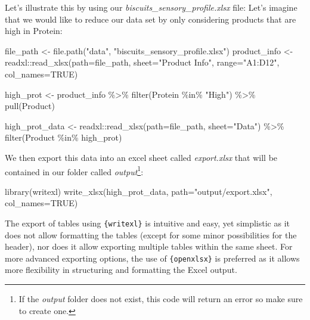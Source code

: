 \documentclass[
]{krantz}
\makeatletter
\newenvironment{Shaded}{\begin{snugshade}}{\end{snugshade}}
\newcommand{\AttributeTok}[1]{\textcolor[rgb]{0.61,0.61,0.61}{#1}}
\newcommand{\ConstantTok}[1]{\textcolor[rgb]{0,0,0}{#1}}
\newcommand{\FunctionTok}[1]{\textcolor[rgb]{0,0,0}{#1}}
\newcommand{\NormalTok}[1]{#1}
\newcommand{\OtherTok}[1]{\textcolor[rgb]{0.37,0.37,0.37}{#1}}
\newcommand{\SpecialCharTok}[1]{\textcolor[rgb]{0,0,0}{#1}}
\newcommand{\StringTok}[1]{\textcolor[rgb]{0.5,0.5,0.5}{#1}}
\newenvironment{kframe}{%
\medskip{}
\setlength{\fboxsep}{.8em}
 \def\at@end@of@kframe{}%
 \ifinner\ifhmode%
  \def\at@end@of@kframe{\end{minipage}}%
  \begin{minipage}{\columnwidth}%
 \fi\fi%
 \def\FrameCommand##1{\hskip\@totalleftmargin \hskip-\fboxsep
 \colorbox{shadecolor}{##1}\hskip-\fboxsep
     \hskip-\linewidth \hskip-\@totalleftmargin \hskip\columnwidth}%
 \MakeFramed {\advance\hsize-\width
   \@totalleftmargin\z@ \linewidth\hsize
   \@setminipage}}%
 {\par\unskip\endMakeFramed%
 \at@end@of@kframe}
\renewenvironment{Shaded}{\begin{kframe}}{\end{kframe}}
\makeatother
\begin{document}
Let's illustrate this by using our \emph{biscuits\_sensory\_profile.xlsx} file: Let's imagine that we would like to reduce our data set by only considering products that are high in Protein:

\begin{Shaded}
\begin{Highlighting}[]
\NormalTok{file\_path }\OtherTok{\textless{}{-}} \FunctionTok{file.path}\NormalTok{(}\StringTok{"data"}\NormalTok{, }\StringTok{"biscuits\_sensory\_profile.xlsx"}\NormalTok{)}
\NormalTok{product\_info }\OtherTok{\textless{}{-}}\NormalTok{ readxl}\SpecialCharTok{::}\FunctionTok{read\_xlsx}\NormalTok{(}\AttributeTok{path=}\NormalTok{file\_path, }\AttributeTok{sheet=}\StringTok{"Product Info"}\NormalTok{, }
                                  \AttributeTok{range=}\StringTok{"A1:D12"}\NormalTok{, }\AttributeTok{col\_names=}\ConstantTok{TRUE}\NormalTok{)}

\NormalTok{high\_prot }\OtherTok{\textless{}{-}}\NormalTok{ product\_info }\SpecialCharTok{\%\textgreater{}\%} 
  \FunctionTok{filter}\NormalTok{(Protein }\SpecialCharTok{\%in\%} \StringTok{"High"}\NormalTok{) }\SpecialCharTok{\%\textgreater{}\%} 
  \FunctionTok{pull}\NormalTok{(Product)}

\NormalTok{high\_prot\_data }\OtherTok{\textless{}{-}}\NormalTok{ readxl}\SpecialCharTok{::}\FunctionTok{read\_xlsx}\NormalTok{(}\AttributeTok{path=}\NormalTok{file\_path, }\AttributeTok{sheet=}\StringTok{"Data"}\NormalTok{) }\SpecialCharTok{\%\textgreater{}\%} 
  \FunctionTok{filter}\NormalTok{(Product }\SpecialCharTok{\%in\%}\NormalTok{ high\_prot)}
\end{Highlighting}
\end{Shaded}

We then export this data into an excel sheet called \emph{export.xlsx} that will be contained in our folder called \emph{output}\footnote{If the \emph{output} folder does not exist, this code will return an error so make sure to create one.}:

\begin{Shaded}
\begin{Highlighting}[]
\FunctionTok{library}\NormalTok{(writexl)}
\FunctionTok{write\_xlsx}\NormalTok{(high\_prot\_data, }\AttributeTok{path=}\StringTok{"output/export.xlsx"}\NormalTok{, }\AttributeTok{col\_names=}\ConstantTok{TRUE}\NormalTok{)}
\end{Highlighting}
\end{Shaded}

The export of tables using \texttt{\{writexl\}} is intuitive and easy, yet simplistic as it does not allow formatting the tables (except for some minor possibilities for the header), nor does it allow exporting multiple tables within the same sheet. For more advanced exporting options, the use of \texttt{\{openxlsx\}} is preferred as it allows more flexibility in structuring and formatting the Excel output.
\end{document}
